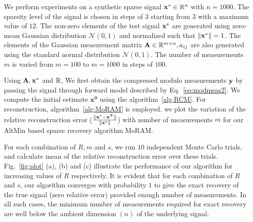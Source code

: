 We perform experiments on a synthetic sparse signal $\mathbf{x^*} \in {\mathbb{R}}^n$ with $n=1000$. The sparsity level of the signal is chosen in steps of $3$ starting from $3$ with a maximum value of $12$. The non-zero elements of the test signal $\mathbf{x^*}$ are generated using zero-mean Gaussian distribution $\mathcal{N}(0, 1)$ and normalized such that $\|\mathbf{x^*}\| =1$. The elements of the Gaussian measurement matrix $\mathbf{A} \in {\mathbb{R}}^{m\times n}, a_{ij}$ are also generated using the standard normal distribution $\mathcal{N}(0, 1)$. The number of measurements $m$ is varied from $m = 100$ to $m=1000$ in steps of $100$.  



Using $\mathbf{A, x^*}$ and ${\mathbb{R}}$, We first obtain the compressed modulo measurements $\mathbf{y}$ by passing the signal through forward model described by Eq.~\ref{eq:modmeas2}. We compute the initial estimate $\mathbf{x^0}$ using the algorithm~\ref{alg:RCM}. For reconstruction, algorithm~\ref{alg:MoRAM} is employed. we plot the variation of the relative reconstruction error ($\frac{\|\mathbf{x^*-x^T}\|}{\|\mathbf{x^*}\|}$) with number of measurements $m$ for our AltMin based sparse recovery algorithm MoRAM.

For each combination of $R, m$ and $s$, we run $10$ independent Monte Carlo trials, and calculate mean of the relative reconstruction error over these trials. Fig.~\ref{fig:plot} (a), (b) and (c) illustrate the performance of our algorithm for increasing values of $R$ respectively. It is evident that for each combination of $R$ and $s$, our algorithm converges with probability $1$ to give the exact recovery of the true signal (zero relative error) provided enough number of measurements. In all such cases, the minimum number of measurements required for exact recovery are well below the ambient dimension $(n)$ of the underlying signal. 

